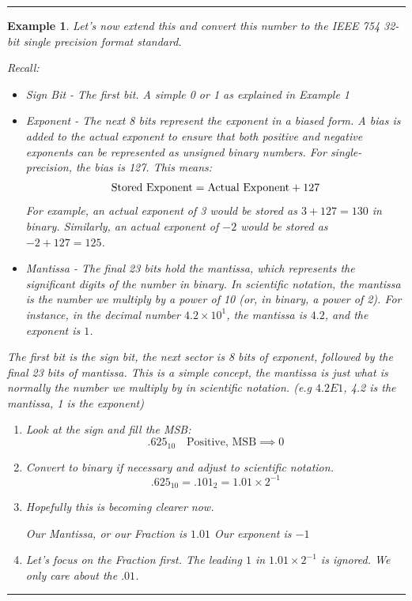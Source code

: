 \documentclass[12pt]{article}
\newtheorem{example}{Example}
\newenvironment{examp}
{
    \vspace{0.5cm}
    \hrule
    \begin{example}\upshape
}
{
    \end{example}
    \hrule
    \vspace{0.5cm}
}
\begin{document}
\begin{examp}
	Let's now extend this and convert this number to the IEEE
	754 32-bit single precision format standard.

	\textit{Recall:}
	\begin{itemize}
		\item Sign Bit - The first bit. A simple 0 or 1 as explained in Example 1
		\item Exponent - The next 8 bits represent the exponent in a biased form. A bias is added to the actual exponent to ensure that both positive and negative exponents can be represented as unsigned binary numbers. For single-precision, the bias is 127. This means:
		      \[
			      \text{Stored Exponent}  =\text{Actual Exponent}+127 \\
		      \]
		      For example, an actual exponent of 3 would be stored as \(3 + 127 = 130\) in binary. Similarly, an actual exponent of \(-2\) would be stored as \(-2 + 127 = 125\).
		\item Mantissa - The final 23 bits hold the \textit{mantissa}, which represents the significant digits of the number in binary. In scientific notation, the mantissa is the number we multiply by a power of 10 (or, in binary, a power of 2). For instance, in the decimal number $4.2 \times 10^1$, the mantissa is $4.2$, and the exponent is $1$.
	\end{itemize}
	The first bit is the sign bit, the next sector is  8 bits of exponent,
	followed by the final 23 bits of \textit{mantissa.} This is a simple
	concept, the mantissa is just what is normally the number we multiply
	by in scientific notation. (e.g $4.2E1$, 4.2 is the mantissa, 1 is the exponent)
	\begin{enumerate}
		\item Look at the sign and fill the MSB:
		      \[
			      .625_{10} \quad\text{Positive, MSB} \implies 0
		      \]
		\item Convert to binary if necessary and adjust to scientific notation.
		      \[
			      .625_{10} =  .101_2 = 1.01 \times 2^{-1}
		      \]
		\item Hopefully this is becoming clearer now.

		      Our Mantissa, or our \textit{Fraction} is \(1.01\)\newline
		      Our exponent is \(-1\)
		\item Let's focus on the Fraction first.
		      The leading \(1\) in \(1.01 \times 2^{-1}\) is ignored. We only
		      care about the \(.01\).


\end{enumerate}
\end{examp}
\end{document}
